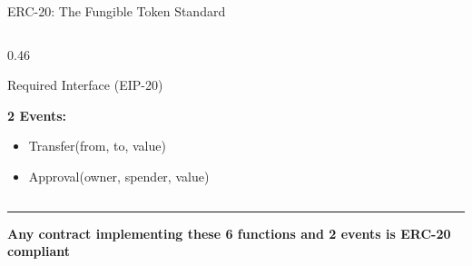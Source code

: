 \documentclass[8pt,aspectratio=169]{beamer}
\newcommand{\bottomnote}[1]{\vfill\vspace{-2mm}\textcolor{mllavender2}{\rule{\textwidth}{0.4pt}}\vspace{1mm}\footnotesize\textbf{#1}}
\begin{document}
\begin{frame}{ERC-20: The Fungible Token Standard}
\begin{columns}[T]
\begin{column}{0.46\textwidth}
\begin{block}{Required Interface (EIP-20)}
\begin{itemize}
        \end{itemize}
        \vspace{3pt}
        \textbf{2 Events:}
        \begin{itemize}\setlength\itemsep{1pt}
          \item {\small\ttfamily Transfer(from, to, value)}
          \item {\small\ttfamily Approval(owner, spender, value)}
        \end{itemize}
      \end{block}
    \end{column}
  \end{columns}
  \bottomnote{Any contract implementing these 6 functions and 2 events is ERC-20 compliant}
\end{frame}

\end{document}

